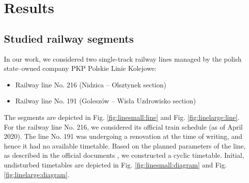 \section{Results}

\subsection{Studied railway segments}
In our work, we considered two single-track railway lines managed by the polish
state--owned company PKP Polskie Linie Kolejowe:

\begin{itemize}
  \item Railway line No. 216 (Nidzica -- Olsztynek section)
  \item Railway line No. 191 (Goleszów -- Wisła Uzdrowisko section)
\end{itemize}

The segments are depicted in Fig. \ref{fig:linesmall:line} and Fig.
\ref{fig:linelarge:line}. For the railway line No. 216, we considered its
official train schedule (as of April 2020). The line No. 191 was undergoing a
renovation at the time of writing, and hence it had no available timetable.
Based on the planned parameters of the line, as described in the official
documents \cite{PKPPLK}, we constructed a cyclic timetable. Initial,
undisturbed timetables are depicted in Fig. \ref{fig:linesmall:diagram} and
Fig. \ref{fig:linelarge:diagram}.

